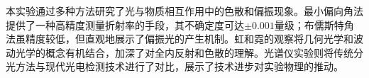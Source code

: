 \documentclass[UTF8]{article}
\begin{document}
本实验通过多种方法研究了光与物质相互作用中的色散和偏振现象。最小偏向角法提供了一种高精度测量折射率的手段，其不确定度可达$\pm 0.001$量级；布儒斯特角法虽精度较低，但直观地展示了偏振光的产生机制。虹和霓的观察将几何光学和波动光学的概念有机结合，加深了对全内反射和色散的理解。光谱仪实验则将传统分光方法与现代光电检测技术进行了对比，展示了技术进步对实验物理的推动。

\end{document}
